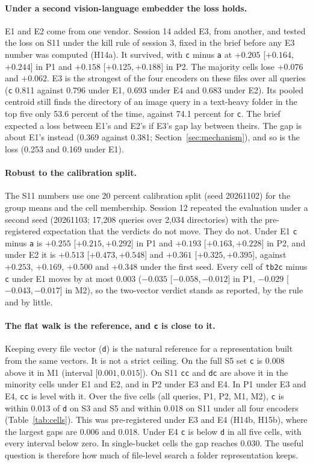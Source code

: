 \documentclass[11pt]{article}
\newcommand{\rep}[1]{\texttt{#1}}
\newcommand{\ci}[2]{[\ensuremath{#1},\,\ensuremath{#2}]}  %
\begin{document}
\paragraph{Under a second vision-language embedder the loss holds.} E1 and E2 come from one vendor. Session 14 added E3, from another, and tested the loss on S11 under the kill rule of session 3, fixed in the brief before any E3 number was computed (H14a). It survived, with \rep{c} minus \rep{a} at $+0.205$ \ci{+0.164}{+0.244} in P1 and $+0.158$ \ci{+0.125}{+0.188} in P2. The majority cells lose $+0.076$ and $+0.062$. E3 is the strongest of the four encoders on these files over all queries (\rep{c} 0.811 against 0.796 under E1, 0.693 under E4 and 0.683 under E2). Its pooled centroid still finds the directory of an image query in a text-heavy folder in the top five only 53.6 percent of the time, against 74.1 percent for \rep{c}. The brief expected a loss between E1's and E2's if E3's gap lay between theirs. The gap is about E1's instead (0.369 against 0.381; Section~\ref{sec:mechanism}), and so is the loss (0.253 and 0.169 under E1).

\paragraph{Robust to the calibration split.} The S11 numbers use one 20 percent calibration split (seed 20261102) for the group means and the cell membership. Session 12 repeated the evaluation under a second seed (20261103; 17,208 queries over 2,034 directories) with the pre-registered expectation that the verdicts do not move. They do not. Under E1 \rep{c} minus \rep{a} is $+0.255$ \ci{+0.215}{+0.292} in P1 and $+0.193$ \ci{+0.163}{+0.228} in P2, and under E2 it is $+0.513$ \ci{+0.473}{+0.548} and $+0.361$ \ci{+0.325}{+0.395}, against $+0.253$, $+0.169$, $+0.500$ and $+0.348$ under the first seed. Every cell of \rep{tb2c} minus \rep{c} under E1 moves by at most 0.003 ($-0.035$ \ci{-0.058}{-0.012} in P1, $-0.029$ \ci{-0.043}{-0.017} in M2), so the two-vector verdict stands as reported, by the rule and by little.

\paragraph{The flat walk is the reference, and \rep{c} is close to it.} Keeping every file vector (\rep{d}) is the natural reference for a representation built from the same vectors. It is not a strict ceiling. On the full S5 set \rep{c} is 0.008 above it in M1 (interval \ci{0.001}{0.015}). On S11 \rep{cc} and \rep{dc} are above it in the minority cells under E1 and E2, and in P2 under E3 and E4. In P1 under E3 and E4, \rep{cc} is level with it. Over the five cells (all queries, P1, P2, M1, M2), \rep{c} is within 0.013 of \rep{d} on S3 and S5 and within 0.018 on S11 under all four encoders (Table~\ref{tab:cells}). This was pre-registered under E3 and E4 (H14b, H15b), where the largest gaps are 0.006 and 0.018. Under E4 \rep{c} is below \rep{d} in all five cells, with every interval below zero. In single-bucket cells the gap reaches 0.030. The useful question is therefore how much of file-level search a folder representation keeps.
\end{document}
